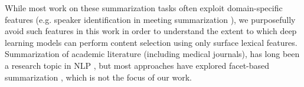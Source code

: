 While most work on these summarization tasks
 often exploit domain-specific features (e.g. speaker identification in meeting summarization \cite{galley2006skip,gillick2009global}),
we purposefully avoid such features in this work in order to understand 
the extent to which deep learning models can perform content 
selection using only surface lexical features.
Summarization of academic literature (including medical journals), has long 
been a research topic in NLP
\cite{kupiec1995trainable,elhadad2005customization}, but most approaches have
explored facet-based summarization \cite{jaidka2017insights}, which is not the focus of our work.












%
%
%
%




